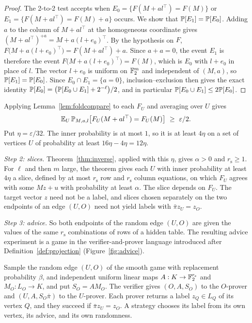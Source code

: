 \begin{proof}
The 2-to-2 test accepts when $E_0=\{F(M+al^\top)=F(M)\}$ or $E_1=\{F(M+al^\top)=F(M)+a\}$ occurs. We show that $\mathbb{P}[E_1]=\mathbb{P}[E_0]$. Adding $a$ to the column of $M+al^\top$ at the homogeneous coordinate gives $(M+al^\top)^{+a}=M+a(l+e_0)^\top$. By the hypothesis on $F$, $F\bigl(M+a(l+e_0)^\top\bigr)=F(M+al^\top)+a$. Since $a+a=0$, the event $E_1$ is therefore the event $F\bigl(M+a(l+e_0)^\top\bigr)=F(M)$, which is $E_0$ with $l+e_0$ in place of $l$. The vector $l+e_0$ is uniform on $\mathbb{F}_2^m$ and independent of $(M,a)$, so $\mathbb{P}[E_1]=\mathbb{P}[E_0]$. Since $E_0\cap E_1=\{a=0\}$, inclusion--exclusion then gives the exact identity $\mathbb{P}[E_0]=\bigl(\mathbb{P}[E_0\cup E_1]+2^{-\ell}\bigr)/2$, and in particular $\mathbb{P}[E_0\cup E_1]\le2\mathbb{P}[E_0]$.
\end{proof}

Applying Lemma~\ref{lem:foldcompare} to each $F_U$ and averaging over $U$ gives
\[
\E_U\,\Prob_{M,a,l}\bigl[F_U(M+al^\top)=F_U(M)\bigr]\ \ge\ \varepsilon/2.
\]
Put $\eta=\varepsilon/32$. The inner probability is at most $1$, so it is at least $4\eta$ on a set of vertices $U$ of probability at least $16\eta-4\eta=12\eta$.

\emph{Step 2: slices.} Theorem~\ref{thm:inverse}, applied with this $\eta$, gives $\alpha>0$ and $r_{\mathrm s}\ge1$. For $\ell$ and then $m$ large, the theorem gives each $U$ with inner probability at least $4\eta$ a slice, defined by at most $r_{\mathrm s}$ row and $r_{\mathrm s}$ column equations, on which $F_U$ agrees with some $Mz+u$ with probability at least $\alpha$. The slice depends on $F_U$. The target vector $z$ need not be a label, and slices chosen separately on the two endpoints of an edge $(U,O)$ need not yield labels with $\bar\pi z_U=z_O$.

\emph{Step 3: advice.} So both endpoints of the random edge $(U,O)$ are given the values of the same $r_{\mathrm s}$ combinations of rows of a hidden table. The resulting advice experiment is a game in the verifier-and-prover language introduced after Definition~\ref{def:projection} (Figure~\ref{fig:advice}).

\begin{definition}\label{def:advice}
Sample the random edge $(U,O)$ of the smooth game with replacement probability $\beta$, and independent uniform linear maps $A:K\to\mathbb{F}_2^{r_{\mathrm s}}$ and $M_O:L_O\to K$, and put $S_O=AM_O$. The verifier gives $(O,A,S_O)$ to the $O$-prover and $(U,A,S_O\bar\pi)$ to the $U$-prover. Each prover returns a label $z_Q\in L_Q$ of its vertex $Q$, and they succeed if $\bar\pi z_U=z_O$. A strategy chooses its label from its own vertex, its advice, and its own randomness.
\end{definition}

